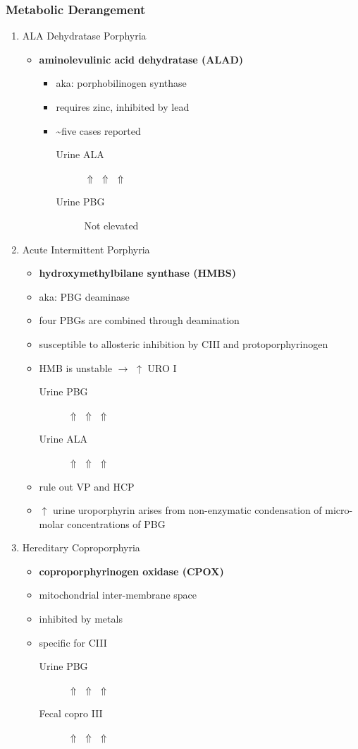 \documentclass[12pt]{scrartcl}
\begin{document}
\subsubsection{Metabolic Derangement}
\label{sec:orge16ee79}
\begin{enumerate}
\item ALA Dehydratase Porphyria
\label{sec:org497ba84}
\begin{itemize}
\item \textbf{aminolevulinic acid dehydratase (ALAD)} 
\begin{itemize}
\item aka: porphobilinogen synthase
\item requires zinc, inhibited by lead
\item \textasciitilde{}five cases reported
\begin{description}
\item[{Urine ALA}] \(\Uparrow\) \(\Uparrow\) \(\Uparrow\)
\item[{Urine PBG}] Not elevated
\end{description}
\end{itemize}
\end{itemize}

\item Acute Intermittent Porphyria
\label{sec:orgd5e9977}
\begin{itemize}
\item \textbf{hydroxymethylbilane synthase (HMBS)}
\item aka: PBG deaminase
\item four PBGs are combined through deamination
\item susceptible to allosteric inhibition by CIII and protoporphyrinogen
\item HMB is unstable \(\to\) \(\uparrow\) URO I
\begin{description}
\item[{Urine PBG}] \(\Uparrow\) \(\Uparrow\) \(\Uparrow\)
\item[{Urine ALA}] \(\Uparrow\) \(\Uparrow\) \(\Uparrow\)
\end{description}
\item rule out VP and HCP
\item \(\uparrow\) urine uroporphyrin arises from non-enzymatic
condensation of micro-molar concentrations of PBG
\end{itemize}

\item Hereditary Coproporphyria
\label{sec:org36a101d}
\begin{itemize}
\item \textbf{coproporphyrinogen oxidase (CPOX)}
\item mitochondrial inter-membrane space
\item inhibited by metals
\item specific for CIII
\begin{description}
\item[{Urine PBG}] \(\Uparrow\) \(\Uparrow\) \(\Uparrow\)
\item[{Fecal copro III}] \(\Uparrow\) \(\Uparrow\) \(\Uparrow\)
\end{description}
\end{itemize}


\end{enumerate}
\end{document}
